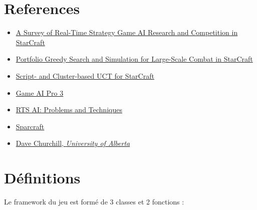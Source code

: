 \documentclass[a4paper, 11pt]{article}
\theoremstyle{definition}
\begin{document}
\section*{References}
\begin{itemize}
    \item \href{https://www.researchgate.net/publication/260711387_A_Survey_of_Real-Time_Strategy_Game_AI_Research_and_Competition_in_StarCraft}{A Survey of Real-Time Strategy Game AI Research and Competition in StarCraft}
    \item \href{https://web.archive.org/web/20130919101338/http://eldar.mathstat.uoguelph.ca:80/dashlock/cig2013/papers/paper_68.pdf}{Portfolio Greedy Search and Simulation for Large-Scale Combat in StarCraft}
    \item \href{https://storage.kghost.de/cig_proc/full/paper_76.pdf}{Script- and Cluster-based UCT for StarCraft}
    \item \href{http://www.gameaipro.com/}{Game AI Pro 3}
    \item \href{https://web.archive.org/web/20190303080330/http://richoux.fr:80/publications/ecgg15_chapter-rts_ai.pdf}{RTS AI: Problems and Techniques}
    \item \href{https://code.google.com/archive/p/sparcraft/}{Sparcraft}
    \item \href{https://www.youtube.com/@DaveChurchill}{Dave Churchill, \emph{University of Alberta}}
\end{itemize}
\newpage

\section*{Définitions}
Le framework du jeu est formé de 3 classes et 2 fonctions :
\end{document}
